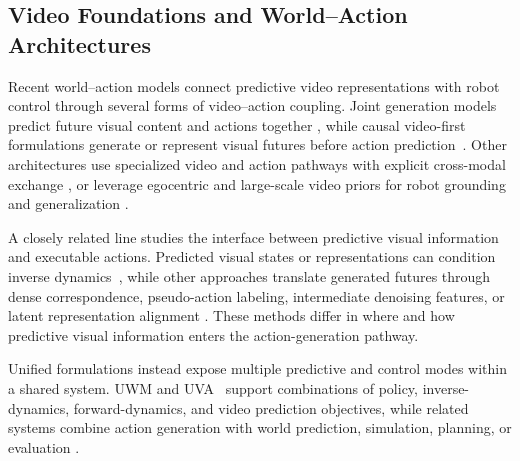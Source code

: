 
\subsection{Video Foundations and World--Action Architectures}

Recent world--action models connect predictive video representations with
robot control through several forms of video--action coupling. Joint
generation models predict future visual content and actions together
\cite{ye2026world, cosmos3, shen2026videovla, guo2024prediction}, while
causal video-first formulations generate or represent visual futures before
action prediction~\cite{li2026causal, rhoda2026dva}. Other architectures use
specialized video and action pathways with explicit cross-modal exchange
\cite{yang2026covar, zhang2026deva}, or leverage egocentric and large-scale
video priors for robot grounding and generalization
\cite{li2026egowam, zhou2026zero, wu2026zimablue, qiu2026vid2wam}.

A closely related line studies the interface between predictive visual
information and executable actions. Predicted visual states or representations
can condition inverse dynamics~\cite{tian2025predictive, hu2024video, li2026turningvideomodelsgeneralist}, while
other approaches translate generated futures through dense correspondence,
pseudo-action labeling, intermediate denoising features, or latent
representation alignment
\cite{ko2024learning, jang2025dreamgen, ma2026dit4dit,
vuong2026world2act}. These methods differ in where and how predictive visual
information enters the action-generation pathway.

Unified formulations instead expose multiple predictive and control modes
within a shared system. UWM and UVA~\cite{zhu2025unified, li2503unified}
support combinations of policy, inverse-dynamics, forward-dynamics, and video
prediction objectives, while related systems combine action generation with
world prediction, simulation, planning, or evaluation
\cite{cen2025worldvla, kim2026cosmos, sun2026riemann, bi2026motus2,
guo2026unified}.

